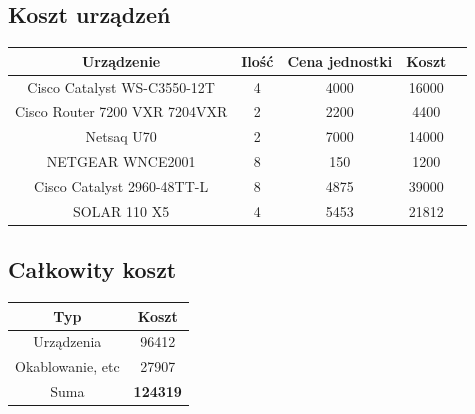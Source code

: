 \subsection{Koszt urządzeń}
\begin{center}
    \begin{tabular}{|c|c|c|c|c|}
    \hline
    Urządzenie &	Ilość&	Cena jednostki	& Koszt \\ \hline
Cisco Catalyst WS-C3550-12T &	4	&4000	&16000 \\ \hline
Cisco Router 7200 VXR 7204VXR&	2	&2200	&4400\\ \hline
Netsaq U70	&2	&7000	&14000\\ \hline
NETGEAR WNCE2001	&8	&150	&1200\\ \hline
Cisco Catalyst 2960-48TT-L	&8	&4875	&39000\\ \hline
SOLAR 110 X5 	&4	&5453	&21812\\ \hline

\end{tabular}
\end{center}

\subsection{Całkowity koszt}
\begin{center}
    \begin{tabular}{|c|c|}
    \hline
 Typ & Koszt \\ \hline
 Urządzenia & 96412 \\ \hline
 Okablowanie, etc & 27907 \\ \hline
 Suma & \textbf{124319} \\ \hline
\end{tabular}
\end{center}